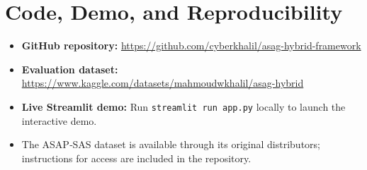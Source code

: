\documentclass[11pt,a4paper]{article}
\begin{document}
\section{Code, Demo, and Reproducibility}
\label{sec:code}
\begin{itemize}[noitemsep]
\item \textbf{GitHub repository:} \url{https://github.com/cyberkhalil/asag-hybrid-framework}
\item \textbf{Evaluation dataset:} \url{https://www.kaggle.com/datasets/mahmoudwkhalil/asag-hybrid}
\item \textbf{Live Streamlit demo:} Run \texttt{streamlit run app.py} locally to launch the interactive demo.
\item The ASAP‑SAS dataset is available through its original distributors; instructions for access are included in the repository.
\end{itemize}
\end{document}
